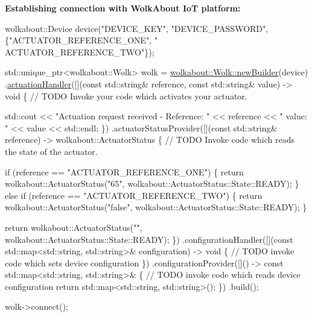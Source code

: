 {\bfseries Establishing connection with Wolk\+About IoT platform\+:} 
\begin{DoxyCode}
wolkabout::Device device(\textcolor{stringliteral}{"DEVICE\_KEY"}, \textcolor{stringliteral}{"DEVICE\_PASSWORD"}, \{\textcolor{stringliteral}{"ACTUATOR\_REFERENCE\_ONE"}, \textcolor{stringliteral}{"
      ACTUATOR\_REFERENCE\_TWO"}\});

std::unique\_ptr<wolkabout::Wolk> wolk =
  \hyperlink{classwolkabout_1_1Wolk_a91270bb8552c2dee634e552111db4bb0}{wolkabout::Wolk::newBuilder}(device)
    .\hyperlink{classwolkabout_1_1WolkBuilder_a5c8799ad21b6bb0f0c866af3295a69b7}{actuationHandler}([](\textcolor{keyword}{const} std::string& reference, \textcolor{keyword}{const} std::string& value) -> \textcolor{keywordtype}{void} \{
        \textcolor{comment}{// TODO Invoke your code which activates your actuator.}

        std::cout << \textcolor{stringliteral}{"Actuation request received - Reference: "} << reference << \textcolor{stringliteral}{" value: "} << value << 
      std::endl;
    \})
    .actuatorStatusProvider([](\textcolor{keyword}{const} std::string& reference) -> wolkabout::ActuatorStatus \{
        \textcolor{comment}{// TODO Invoke code which reads the state of the actuator.}

        \textcolor{keywordflow}{if} (reference == \textcolor{stringliteral}{"ACTUATOR\_REFERENCE\_ONE"}) \{
            \textcolor{keywordflow}{return} wolkabout::ActuatorStatus(\textcolor{stringliteral}{"65"}, wolkabout::ActuatorStatus::State::READY);
        \} \textcolor{keywordflow}{else} \textcolor{keywordflow}{if} (reference == \textcolor{stringliteral}{"ACTUATOR\_REFERENCE\_TWO"}) \{
            \textcolor{keywordflow}{return} wolkabout::ActuatorStatus(\textcolor{stringliteral}{"false"}, wolkabout::ActuatorStatus::State::READY);
        \}

        \textcolor{keywordflow}{return} wolkabout::ActuatorStatus(\textcolor{stringliteral}{""}, wolkabout::ActuatorStatus::State::READY);
    \})
    .configurationHandler([](\textcolor{keyword}{const} std::map<std::string, std::string>& configuration) -> \textcolor{keywordtype}{void} \{
        \textcolor{comment}{// TODO invoke code which sets device configuration}
    \})
    .configurationProvider([]() -> \textcolor{keyword}{const} std::map<std::string, std::string>& \{
        \textcolor{comment}{// TODO invoke code which reads device configuration}
        \textcolor{keywordflow}{return} std::map<std::string, std::string>();
    \})
    .build();

    wolk->connect();
\end{DoxyCode}


